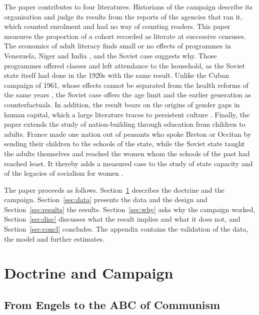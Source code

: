 \documentclass[12pt]{article}
\begin{document}
The paper contributes to four literatures. Historians of the campaign \citep{eklof1987,clark2000} describe its organisation and judge its results from the reports of the agencies that ran it, which counted enrolment and had no way of counting readers. This paper measures the proportion of a cohort recorded as literate at successive censuses. The economics of adult literacy finds small or no effects of programmes in Venezuela, Niger and India \citep{ortega2008,aker2012,banerji2017}, and the Soviet case suggests why. Those programmes offered classes and left attendance to the household, as the Soviet state itself had done in the 1920s with the same result. Unlike the Cuban campaign of 1961, whose effects cannot be separated from the health reforms of the same years \citep{mellace2026}, the Soviet case offers the age limit and the earlier generation as counterfactuals. In addition, the result bears on the origins of gender gaps in human capital, which a large literature traces to persistent culture \citep{alesina2013}. Finally, the paper extends the study of nation-building through education \citep{weber1976,bandiera2019,alesina2021,blanc2023} from children to adults. France made one nation out of peasants who spoke Breton or Occitan by sending their children to the schools of the state, while the Soviet state taught the adults themselves and reached the women whom the schools of the past had reached least. It thereby adds a measured case to the study of state capacity and of the legacies of socialism for women \citep{besley2009,charnysh2019,charnysh2024,campa2019,lippmann2020}.

The paper proceeds as follows. Section~\ref{sec:doctrine} describes the doctrine and the campaign. Section~\ref{sec:data} presents the data and the design and Section~\ref{sec:results} the results. Section~\ref{sec:why} asks why the campaign worked, Section~\ref{sec:disc} discusses what the result implies and what it does not, and Section~\ref{sec:concl} concludes. The appendix contains the validation of the data, the model and further estimates.


\section{Doctrine and Campaign}\label{sec:doctrine}

\subsection{From Engels to the ABC of Communism}
\end{document}
